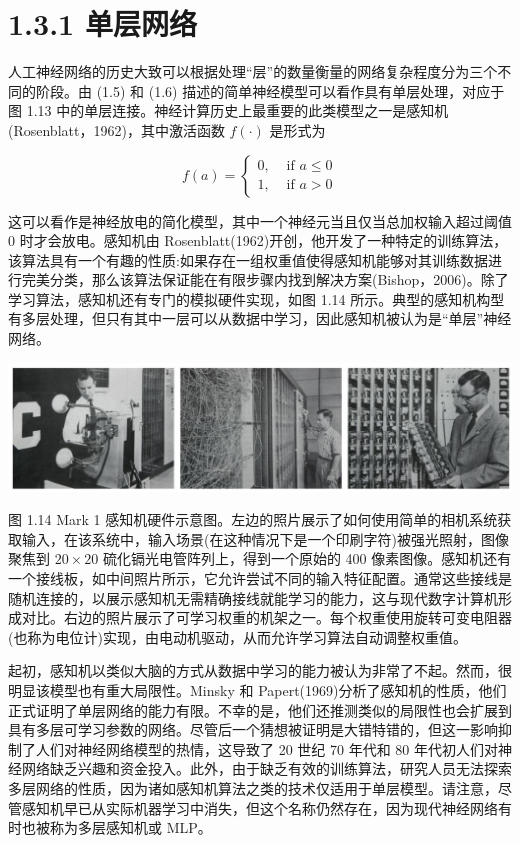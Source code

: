 \documentclass[10pt]{report}
\begin{document}
\section*{1.3.1 单层网络}

人工神经网络的历史大致可以根据处理“层”的数量衡量的网络复杂程度分为三个不同的阶段。由 (1.5) 和 (1.6) 描述的简单神经模型可以看作具有单层处理，对应于图 1.13 中的单层连接。神经计算历史上最重要的此类模型之一是感知机(Rosenblatt，1962)，其中激活函数 \(f\left( \cdot \right)\) 是形式为

\[
f\left( a\right)  = \left\{  \begin{array}{ll} 0, & \text{ if }a \leq  0 \\  1, & \text{ if }a > 0 \end{array}\right.  \tag{1.7}
\]

这可以看作是神经放电的简化模型，其中一个神经元当且仅当总加权输入超过阈值 0 时才会放电。感知机由 Rosenblatt(1962)开创，他开发了一种特定的训练算法，该算法具有一个有趣的性质:如果存在一组权重值使得感知机能够对其训练数据进行完美分类，那么该算法保证能在有限步骤内找到解决方案(Bishop，2006)。除了学习算法，感知机还有专门的模拟硬件实现，如图 1.14 所示。典型的感知机构型有多层处理，但只有其中一层可以从数据中学习，因此感知机被认为是“单层”神经网络。

\begin{center}
\includegraphics[max width=1.0\textwidth]{images/0194e279-9b28-703a-88f4-c3ac21e2010d_37_207_344_1342_344_0.jpg}
\end{center}
\hspace*{3em} 

图 1.14 Mark 1 感知机硬件示意图。左边的照片展示了如何使用简单的相机系统获取输入，在该系统中，输入场景(在这种情况下是一个印刷字符)被强光照射，图像聚焦到 \({20} \times  {20}\) 硫化镉光电管阵列上，得到一个原始的 400 像素图像。感知机还有一个接线板，如中间照片所示，它允许尝试不同的输入特征配置。通常这些接线是随机连接的，以展示感知机无需精确接线就能学习的能力，这与现代数字计算机形成对比。右边的照片展示了可学习权重的机架之一。每个权重使用旋转可变电阻器(也称为电位计)实现，由电动机驱动，从而允许学习算法自动调整权重值。

起初，感知机以类似大脑的方式从数据中学习的能力被认为非常了不起。然而，很明显该模型也有重大局限性。Minsky 和 Papert(1969)分析了感知机的性质，他们正式证明了单层网络的能力有限。不幸的是，他们还推测类似的局限性也会扩展到具有多层可学习参数的网络。尽管后一个猜想被证明是大错特错的，但这一影响抑制了人们对神经网络模型的热情，这导致了 20 世纪 70 年代和 80 年代初人们对神经网络缺乏兴趣和资金投入。此外，由于缺乏有效的训练算法，研究人员无法探索多层网络的性质，因为诸如感知机算法之类的技术仅适用于单层模型。请注意，尽管感知机早已从实际机器学习中消失，但这个名称仍然存在，因为现代神经网络有时也被称为多层感知机或 MLP。
\end{document}
